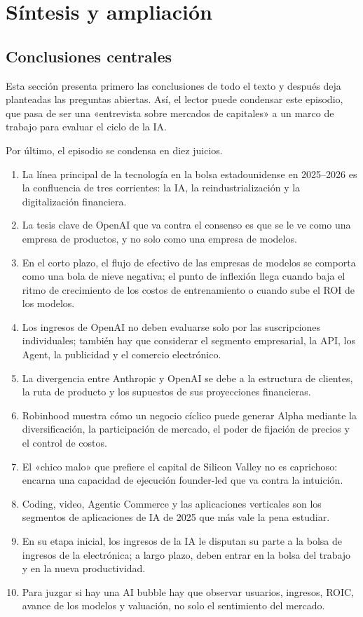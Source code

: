 \section{Síntesis y ampliación}

\subsection{Conclusiones centrales}

Esta sección presenta primero las conclusiones de todo el texto y después deja planteadas las preguntas abiertas. Así, el lector puede condensar este episodio, que pasa de ser una «entrevista sobre mercados de capitales» a un marco de trabajo para evaluar el ciclo de la IA.

Por último, el episodio se condensa en diez juicios.

\begin{enumerate}
\item La línea principal de la tecnología en la bolsa estadounidense en 2025--2026 es la confluencia de tres corrientes: la IA, la reindustrialización y la digitalización financiera.
\item La tesis clave de OpenAI que va contra el consenso es que se le ve como una empresa de productos, y no solo como una empresa de modelos.
\item En el corto plazo, el flujo de efectivo de las empresas de modelos se comporta como una bola de nieve negativa; el punto de inflexión llega cuando baja el ritmo de crecimiento de los costos de entrenamiento o cuando sube el ROI de los modelos.
\item Los ingresos de OpenAI no deben evaluarse solo por las suscripciones individuales; también hay que considerar el segmento empresarial, la API, los Agent, la publicidad y el comercio electrónico.
\item La divergencia entre Anthropic y OpenAI se debe a la estructura de clientes, la ruta de producto y los supuestos de sus proyecciones financieras.
\item Robinhood muestra cómo un negocio cíclico puede generar Alpha mediante la diversificación, la participación de mercado, el poder de fijación de precios y el control de costos.
\item El «chico malo» que prefiere el capital de Silicon Valley no es caprichoso: encarna una capacidad de ejecución founder-led que va contra la intuición.
\item Coding, video, Agentic Commerce y las aplicaciones verticales son los segmentos de aplicaciones de IA de 2025 que más vale la pena estudiar.
\item En su etapa inicial, los ingresos de la IA le disputan su parte a la bolsa de ingresos de la electrónica; a largo plazo, deben entrar en la bolsa del trabajo y en la nueva productividad.
\item Para juzgar si hay una AI bubble hay que observar usuarios, ingresos, ROIC, avance de los modelos y valuación, no solo el sentimiento del mercado.
\end{enumerate}

